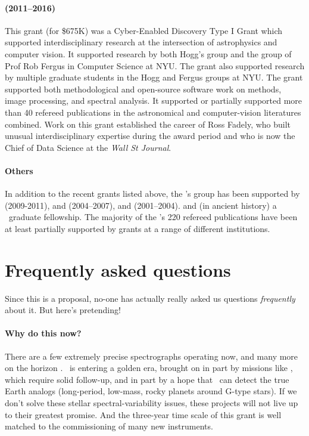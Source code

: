 \documentclass[12pt, letterpaper]{article}
\begin{document}
\paragraph{
 (2011--2016)}
This grant (for \$675K) was a Cyber-Enabled Discovery Type I Grant
which supported interdisciplinary research at the intersection of
astrophysics and computer vision.  It supported research by both
Hogg's group and the group of Prof Rob Fergus in Computer Science at
NYU.
The grant also supported research by multiple graduate students in the
Hogg and Fergus groups at NYU.
The grant supported both methodological and open-source software work
on  methods, image processing, and spectral analysis.
It supported or partially supported
more than 40 refereed publications in the astronomical and
computer-vision literatures combined.
Work on this grant established the career of Ross Fadely, who built unusual
interdisciplinary expertise during the award period and who is now the
Chief of Data Science at the \textit{Wall St Journal}.

\paragraph{Others}
In addition to the recent grants listed above, the \PI's group has been supported by
 (2009-2011),
and
 (2004--2007),
and
 (2001--2004).
and (in ancient history) a \NSF\ graduate fellowship.
The majority of the \PI's 220 refereed publications have been at least partially supported
by \NSF grants at a range of different institutions.

\section{Frequently asked questions}

Since this is a proposal, no-one has actually really asked us
questions \emph{frequently} about it.
But here's pretending!

\paragraph{Why do this now?}
There are a few extremely precise spectrographs operating now, 
and many more on the horizon \citep{Wright2017}.
\EPRV\ is entering a golden era, brought on in part by missions like
\TESS, which require solid follow-up, and in part by a hope that
\EPRV\ can detect the true Earth analogs (long-period, low-mass, rocky
planets around G-type stars).
If we don't solve these stellar spectral-variability issues, these
projects will not live up to their greatest promise.
And the three-year time scale of this grant is well matched to the
commissioning of many new instruments.
\end{document}
